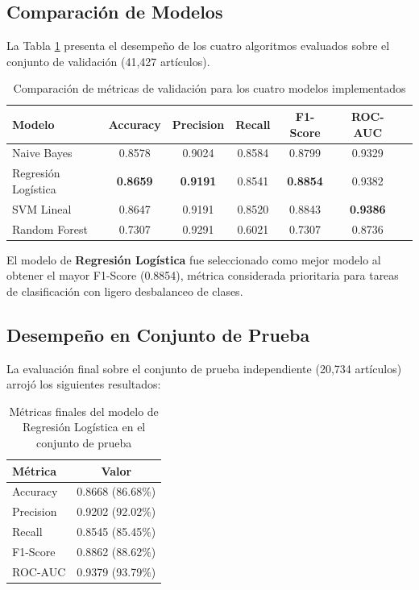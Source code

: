 \documentclass[12pt,a4paper]{article}
\begin{document}
\subsection{Comparación de Modelos}

La Tabla \ref{tab:models} presenta el desempeño de los cuatro algoritmos evaluados sobre el conjunto de validación (41,427 artículos).

\begin{table}[H]
\centering
\caption{Comparación de métricas de validación para los cuatro modelos implementados}
\label{tab:models}
\begin{tabular}{lcccccc}
\toprule
\textbf{Modelo} & \textbf{Accuracy} & \textbf{Precision} & \textbf{Recall} & \textbf{F1-Score} & \textbf{ROC-AUC} \\
\midrule
Naive Bayes         & 0.8578 & 0.9024 & 0.8584 & 0.8799 & 0.9329 \\
Regresión Logística & \textbf{0.8659} & \textbf{0.9191} & 0.8541 & \textbf{0.8854} & 0.9382 \\
SVM Lineal          & 0.8647 & 0.9191 & 0.8520 & 0.8843 & \textbf{0.9386} \\
Random Forest       & 0.7307 & 0.9291 & 0.6021 & 0.7307 & 0.8736 \\
\bottomrule
\end{tabular}
\end{table}

El modelo de \textbf{Regresión Logística} fue seleccionado como mejor modelo al obtener el mayor F1-Score (0.8854), métrica considerada prioritaria para tareas de clasificación con ligero desbalanceo de clases.

\subsection{Desempeño en Conjunto de Prueba}

La evaluación final sobre el conjunto de prueba independiente (20,734 artículos) arrojó los siguientes resultados:

\begin{table}[H]
\centering
\caption{Métricas finales del modelo de Regresión Logística en el conjunto de prueba}
\label{tab:test}
\begin{tabular}{lc}
\toprule
\textbf{Métrica} & \textbf{Valor} \\
\midrule
Accuracy  & 0.8668 (86.68\%) \\
Precision & 0.9202 (92.02\%) \\
Recall    & 0.8545 (85.45\%) \\
F1-Score  & 0.8862 (88.62\%) \\
ROC-AUC   & 0.9379 (93.79\%) \\
\bottomrule
\end{tabular}
\end{table}
\end{document}
